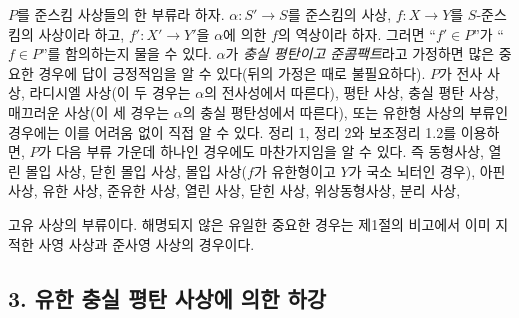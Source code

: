 $P$를 준스킴 사상들의 한 부류라 하자.
$\alpha:S'\longrightarrow S$를 준스킴의 사상,
$f:X\longrightarrow Y$를 $S$-준스킴의 사상이라 하고,
$f':X'\longrightarrow Y'$을 $\alpha$에 의한 $f$의 역상이라 하자.
그러면 “$f'\in P$”가 “$f\in P$”를 함의하는지 물을 수 있다.
$\alpha$가 \emph{충실 평탄이고 준콤팩트}라고 가정하면 많은 중요한
경우에 답이 긍정적임을 알 수 있다(뒤의 가정은 때로 불필요하다).
$P$가 전사 사상, 라디시엘 사상(이 두 경우는 $\alpha$의 전사성에서
따른다), 평탄 사상, 충실 평탄 사상, 매끄러운 사상(이 세 경우는
$\alpha$의 충실 평탄성에서 따른다), 또는 유한형 사상의 부류인
경우에는 이를 어려움 없이 직접 알 수 있다. 정리 1, 정리 2와
보조정리 1.2를 이용하면, $P$가 다음 부류 가운데 하나인 경우에도
마찬가지임을 알 수 있다. 즉 동형사상, 열린 몰입 사상, 닫힌 몰입
사상, 몰입 사상($f$가 유한형이고 $Y$가 국소 뇌터인 경우), 아핀
사상, 유한 사상, 준유한 사상, 열린 사상, 닫힌 사상, 위상동형사상,
분리 사상,

고유 사상의 부류이다. 해명되지 않은 유일한 중요한 경우는
제1절의 비고에서 이미 지적한 사영 사상과 준사영 사상의 경우이다.

\subsection*{3. 유한 충실 평탄 사상에 의한 하강}

